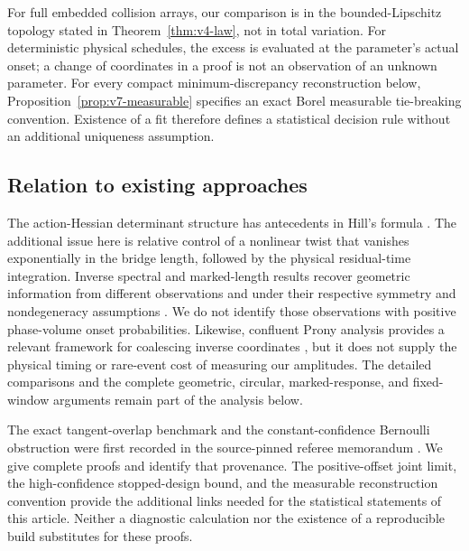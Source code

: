 For full embedded collision arrays, our comparison is in the bounded-Lipschitz topology stated in Theorem~\ref{thm:v4-law}, not in total variation. For deterministic physical schedules, the excess is evaluated at the parameter's actual onset; a change of coordinates in a proof is not an observation of an unknown parameter. For every compact minimum-discrepancy reconstruction below, Proposition~\ref{prop:v7-measurable} specifies an exact Borel measurable tie-breaking convention. Existence of a fit therefore defines a statistical decision rule without an additional uniqueness assumption.

\subsection{Relation to existing approaches}
The action-Hessian determinant structure has antecedents in Hill's formula \citep{Hill}. The additional issue here is relative control of a nonlinear twist that vanishes exponentially in the bridge length, followed by the physical residual-time integration. Inverse spectral and marked-length results recover geometric information from different observations and under their respective symmetry and nondegeneracy assumptions \citep{Zelditch,DSKL,FinamoreLeguil}. We do not identify those observations with positive phase-volume onset probabilities. Likewise, confluent Prony analysis provides a relevant framework for coalescing inverse coordinates \citep{BYProny}, but it does not supply the physical timing or rare-event cost of measuring our amplitudes. The detailed comparisons and the complete geometric, circular, marked-response, and fixed-window arguments remain part of the analysis below.

The exact tangent-overlap benchmark and the constant-confidence Bernoulli obstruction were first recorded in the source-pinned referee memorandum \citep{RefereeV6}. We give complete proofs and identify that provenance. The positive-offset joint limit, the high-confidence stopped-design bound, and the measurable reconstruction convention provide the additional links needed for the statistical statements of this article. Neither a diagnostic calculation nor the existence of a reproducible build substitutes for these proofs.
